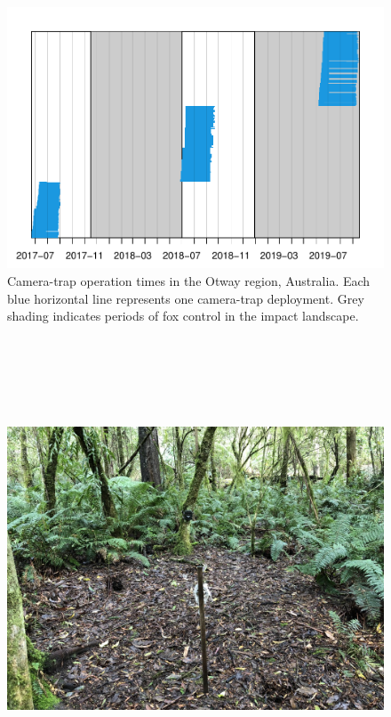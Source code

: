 \documentclass[11pt,a4paper,titlepage,twoside,openright]{style/unimelbthesis}
\begin{document}
\begin{mainmatter}
\newpage

\(~\)

\(~\)

\(~\)
\begin{figure}

{\centering \includegraphics[width=1\linewidth]{figure/density-camop-1} 

}

\caption{Camera-trap operation times in the Otway region, Australia. Each blue horizontal line represents one camera-trap deployment. Grey shading indicates periods of fox control in the impact landscape.}\label{fig:density-camop}
\end{figure}
\newpage

\(~\)

\(~\)

\(~\)
\begin{figure}

{\centering \includegraphics[width=1\linewidth]{figure/camtrap1} 

}
\end{figure}
\end{mainmatter}
\end{document}
